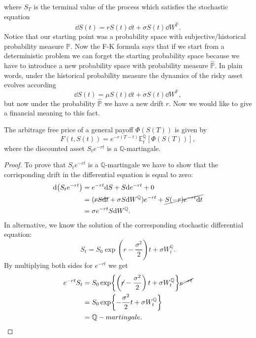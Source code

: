 where $S_T$ is the terminal value of the process which satisfies the stochastic equation
\begin{equation}
    \dd S(t) = rS(t)\dd t + \sigma S(t)\dd W^{\hat{\mathbb{P}}}.
\end{equation}
Notice that our starting point was a probability space with subjective/historical probability measure $\mathbb{P}$. Now the F-K formula says that if we start from a deterministic problem we can forget the starting probability space because we have to introduce a new probability space with probability measure $\hat{\mathbb{P}}$. In plain words, under the historical probability measure the dynamics of the risky asset evolves according
\begin{equation}
    \dd S(t) =  \mu S(t)\dd t + \sigma S(t)\dd W^{\mathbb{P}},
\end{equation}
but now under the probability $\hat{\mathbb{P}}$ we have a new drift $r$. Now we would like to give a financial meaning to this fact.
\begin{proposition}
    The arbitrage free price of a general payoff $\Phi(S(T))$ is given by
    \begin{equation}\label{rnv}
        F(t,S(t)) = e^{-r(T-t)}\mathbb{E}^{\mathbb{Q}}_t [\Phi(S(T))],
    \end{equation}
    where the discounted asset $S_te^{-rt}$ is a $\mathbb{Q}$-martingale.
\end{proposition}
\begin{proof}
    To prove that $S_te^{-rt}$ is a $\mathbb{Q}$-martingale we have to show that the corrisponding drift in the differential equation is equal to zero:
    \begin{align*}
        \dd(S_te^{-rt}) &= e^{-rt}\dd S + S\dd e^{-rt} + 0 \\
        &=
        (\cancel{rS\dd t} + \sigma S\dd W^{\mathbb{Q}})e^{-rt} + \cancel{S(-r)e^{-rt}\dd t} \\
        &=
        \sigma e^{-rt} S\dd W^{\mathbb{Q}}.
    \end{align*}
    In alternative, we know the solution of the corresponding stochastic differential equation:
    \begin{equation*}
        S_t = S_0\exp{\left(r-\frac{\sigma^2}{2}\right)t + \sigma W_t^\mathbb{Q}}.
    \end{equation*}
    By multiplying both sides for $e^{-rt}$ we get
    \begin{align*}
        e^{-rt}S_t &= S_0\exp{\left(\cancel{r}-\frac{\sigma^2}{2}\right)t + \sigma W_t^\mathbb{Q}}\cancel{e^{-rt}} \\
        &=
        S_0\exp{-\frac{\sigma^2}{2}t + \sigma W_t^\mathbb{Q}} \\
        &=
        \mathbb{Q}-martingale.
    \end{align*}
\end{proof}
